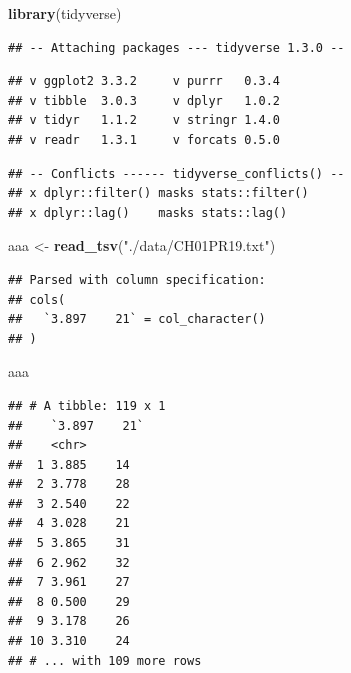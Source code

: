 \documentclass[
]{article}
\newenvironment{Shaded}{\begin{snugshade}}{\end{snugshade}}
\newcommand{\KeywordTok}[1]{\textcolor[rgb]{0.13,0.29,0.53}{\textbf{#1}}}
\newcommand{\NormalTok}[1]{#1}
\newcommand{\StringTok}[1]{\textcolor[rgb]{0.31,0.60,0.02}{#1}}
\begin{document}
\begin{Shaded}
\begin{Highlighting}[]
\KeywordTok{library}\NormalTok{(tidyverse)}
\end{Highlighting}
\end{Shaded}

\begin{verbatim}
## -- Attaching packages --- tidyverse 1.3.0 --
\end{verbatim}

\begin{verbatim}
## v ggplot2 3.3.2     v purrr   0.3.4
## v tibble  3.0.3     v dplyr   1.0.2
## v tidyr   1.1.2     v stringr 1.4.0
## v readr   1.3.1     v forcats 0.5.0
\end{verbatim}

\begin{verbatim}
## -- Conflicts ------ tidyverse_conflicts() --
## x dplyr::filter() masks stats::filter()
## x dplyr::lag()    masks stats::lag()
\end{verbatim}

\begin{Shaded}
\begin{Highlighting}[]
\NormalTok{aaa <-}\StringTok{ }\KeywordTok{read_tsv}\NormalTok{(}\StringTok{"./data/CH01PR19.txt"}\NormalTok{)}
\end{Highlighting}
\end{Shaded}

\begin{verbatim}
## Parsed with column specification:
## cols(
##   `3.897    21` = col_character()
## )
\end{verbatim}

\begin{Shaded}
\begin{Highlighting}[]
\NormalTok{aaa}
\end{Highlighting}
\end{Shaded}

\begin{verbatim}
## # A tibble: 119 x 1
##    `3.897    21`
##    <chr>        
##  1 3.885    14  
##  2 3.778    28  
##  3 2.540    22  
##  4 3.028    21  
##  5 3.865    31  
##  6 2.962    32  
##  7 3.961    27  
##  8 0.500    29  
##  9 3.178    26  
## 10 3.310    24  
## # ... with 109 more rows
\end{verbatim}
\end{document}
